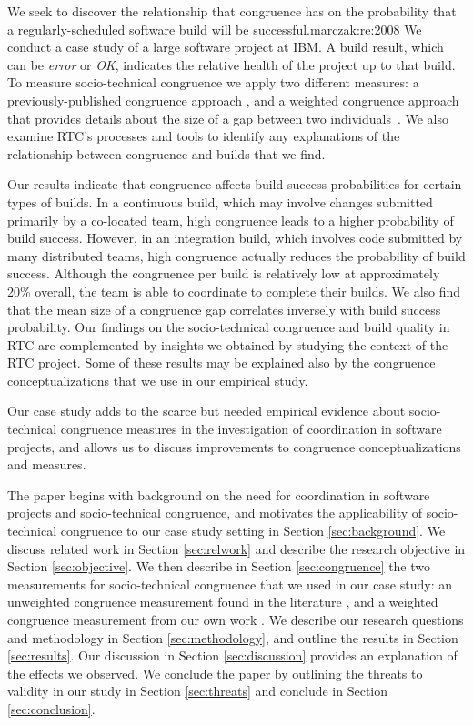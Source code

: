 We seek to discover the relationship that congruence has on the probability that a regularly-scheduled software build will be successful.marczak:re:2008
We conduct a case study of a large software project at IBM.  A build result, which can be \emph{error} or \emph{OK}, indicates the relative health of the project up to that build. To
measure socio-technical congruence we apply two different measures: a
previously-published congruence approach \cite{cataldo:cscw:2006},
and a weighted congruence approach that provides details about the size of a
gap between two individuals~\cite{kwan2009:weighted}. We
also examine RTC's processes and tools to identify any
explanations of the relationship between congruence and builds that
we find.

Our results indicate that congruence affects build success probabilities for certain types of builds.
In a continuous build, which may involve changes submitted primarily by a co-located team, high congruence leads to a higher probability of build success.
However, in an integration build, which involves code submitted by many distributed teams, high congruence actually reduces the probability of build success.
Although the congruence per build is relatively low at approximately 20\% overall, the team is able to coordinate to complete their builds.
We also find that the mean size of a congruence gap correlates inversely with build success probability.
Our findings on the socio-technical congruence and build quality in RTC are complemented by insights we
obtained by studying the context of the RTC project. Some of these results may be explained also by the congruence conceptualizations that we use in our empirical study.

Our case study adds to the scarce but needed empirical evidence about
socio-technical congruence measures in the investigation of coordination in
software projects, and allows us to
discuss improvements to congruence conceptualizations and measures. 

The paper begins with background on the need for coordination in software
projects and socio-technical congruence, and motivates the applicability of
socio-technical congruence to our case study setting in Section
\ref{sec:background}. We discuss related
work in Section \ref{sec:relwork} and describe the research objective in Section \ref{sec:objective}. We then describe
in Section \ref{sec:congruence} the two measurements for socio-technical
congruence that we used in our case study: an unweighted congruence measurement
found in the literature \cite{cataldo:cscw:2006}, and a weighted congruence measurement from
our own work \cite{kwan2009:weighted}. We describe our research questions and
methodology in Section \ref{sec:methodology}, and outline
the results in Section \ref{sec:results}. Our discussion 
in Section \ref{sec:discussion} provides an explanation of the effects we
observed. We conclude the paper by
outlining the threats to validity in our study in Section
\ref{sec:threats} and conclude in Section \ref{sec:conclusion}.

